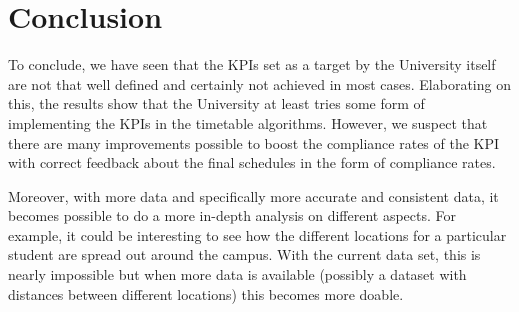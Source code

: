 \section{Conclusion}
To conclude, we have seen that the KPIs set as a target by the University itself are not that well defined and certainly not achieved in most cases. Elaborating on this, the results show that the University at least tries some form of implementing the KPIs in the timetable algorithms. However, we suspect that there are many improvements possible to boost the compliance rates of the KPI with correct feedback about the final schedules in the form of compliance rates.

Moreover, with more data and specifically more accurate and consistent data, it becomes possible to do a more in-depth analysis on different aspects. For example, it could be interesting to see how the different locations for a particular student are spread out around the campus. With the current data set, this is nearly impossible but when more data is available (possibly a dataset with distances between different locations) this becomes more doable.